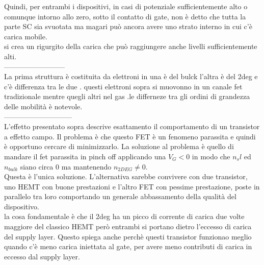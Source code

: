 Quindi, per entrambi i dispositivi, in casi di potenziale sufficientemente alto o comunque intorno allo zero, sotto il contatto di gate, non è detto che tutta la parte SC  sia svuotata ma magari può ancora avere uno strato interno in cui c'è carica mobile.\\ si crea un rigurgito della carica che può raggiungere anche livelli sufficientemente alti.\\
--------------------------\\
La prima struttura è costituita da elettroni in una è del bulck l'altra è del 2deg
e c'è differenza tra le due . questi elettroni  sopra si muovonno in un canale fet tradizionale  mentre quegli altri nel gas .le differneze tra gli ordini di grandezza delle mobilità è notevole.\\
-----------------------------\\

L'effetto presentato sopra descrive esattamento il comportamento di un transistor a effetto campo. Il problema è che questo  FET è un fenomeno parassita e quindi è opportuno cercare di minimizzarlo. La soluzione al problema è quello di mandare il fet parassita in pinch off applicando una $V_G < 0$ in modo che $n_sl$ ed $n_{bulk}$ siano circa 0 ma mantenendo $n_{2DEG} \neq 0$. \\
%
Questa è l'unica soluzione. L'alternativa sarebbe convivere con due transistor, uno HEMT con buone prestazioni  e l'altro FET con pessime prestazione, poste in parallelo tra loro comportando un generale abbassamento della qualità del dispositivo.\\
%
la cosa fondamentale è che il 2deg ha un picco di corrente di carica due volte maggiore del classico HEMT però entrambi si portano dietro l'eccesso di carica del supply layer. Questo spiega anche perchè questi transistor funzionao meglio quando c'è meno carica iniettata al gate, per avere meno contributi di carica in eccesso dal supply layer.
%
